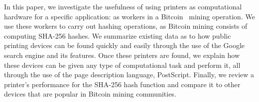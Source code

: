 In this paper, we investigate the usefulness of using printers as computational hardware for a specific application: as workers in a Bitcoin~\cite{nakamoto2008bitcoin} mining operation.
We use these workers to carry out hashing operations, as Bitcoin mining consists of computing SHA-256 hashes.
We summarize existing data as to how public printing devices can be found quickly and easily through the use of the Google search engine and its features.
Once these printers are found, we explain how these devices can be given any type of computational task and perform it, all through the use of the page description language, PostScript.
Finally, we review a printer's performance for the SHA-256 hash function and compare it to other devices that are popular in Bitcoin mining communities.

